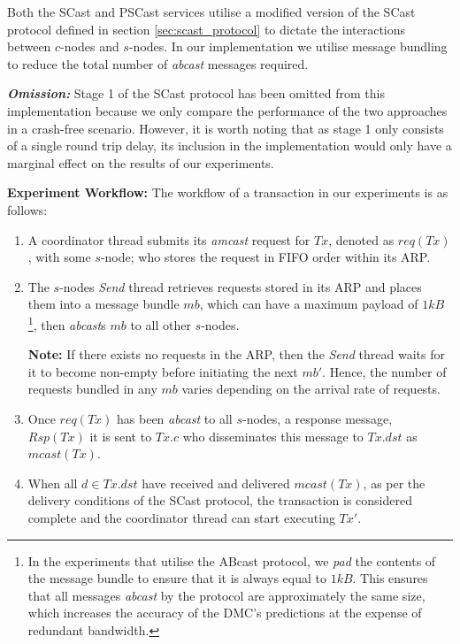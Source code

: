 	Both the \textsf{SCast} and \textsf{PSCast} services utilise a modified version of the \textsf{SCast} protocol defined in section \ref{sec:scast_protocol} to dictate the interactions between $c$-nodes and $s$-nodes.  In our implementation we utilise message bundling to reduce the total number of \emph{abcast} messages required.  
	
    \textbf{\emph{Omission:}} Stage 1 of the \textsf{SCast} protocol has been omitted from this implementation because we only compare the performance of the two approaches in a crash-free scenario.  However, it is worth noting that as stage 1 only consists of a single round trip delay, its inclusion in the implementation would only have a marginal effect on the results of our experiments.  	
	
	\textbf{Experiment Workflow:} The workflow of a transaction in our experiments is as follows:
    \begin{enumerate}
        \item    A coordinator thread submits its \emph{amcast} request for $Tx$, denoted as $req(Tx)$, with some $s$-node; who stores the request in FIFO order within its ARP. 
        
        \item    The $s$-nodes \emph{Send} thread retrieves requests stored in its ARP and places them into a message bundle $mb$, which can have a maximum payload of $1kB$ \footnote{In the experiments that utilise the \textsf{ABcast} protocol, we \emph{pad} the contents of the message bundle to ensure that it is always equal to $1kB$.  This ensures that all messages \emph{abcast} by the protocol are approximately the same size, which increases the accuracy of the DMC's predictions at the expense of redundant bandwidth.}, then \emph{abcast}s $mb$ to all other $s$-nodes.  
        
        \textbf{Note:} If there exists no requests in the ARP, then the \emph{Send} thread waits for it to become non-empty before initiating the next $mb'$.  Hence, the number of requests bundled in any $mb$ varies depending on the arrival rate of requests. 
        
        \item    Once $req(Tx)$ has been \emph{abcast} to all $s$-nodes, a response message, $Rsp(Tx)$ it is sent to $Tx.c$ who disseminates this message to $Tx.dst$ as $mcast(Tx)$.  
        
        \item    When all $d \in Tx.dst$ have received and delivered $mcast(Tx)$, as per the delivery conditions of the \textsf{SCast} protocol, the transaction is considered complete and the coordinator thread can start executing $Tx'$.  
    \end{enumerate}	
	
